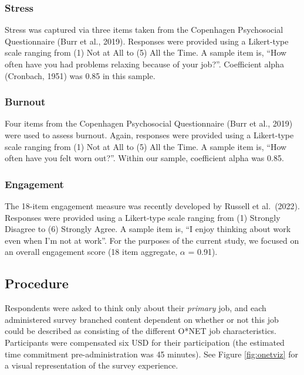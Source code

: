 \documentclass[
  man]{apa7}
\begin{document}
\subsubsection{Stress}\label{stress}

Stress was captured via three items taken from the Copenhagen Psychosocial Questionnaire (Burr et al., 2019). Responses were provided using a Likert-type scale ranging from (1) Not at All to (5) All the Time. A sample item is, ``How often have you had problems relaxing because of your job?''. Coefficient alpha (Cronbach, 1951) was 0.85 in this sample.

\subsubsection{Burnout}\label{burnout}

Four items from the Copenhagen Psychosocial Questionnaire (Burr et al., 2019) were used to assess burnout. Again, responses were provided using a Likert-type scale ranging from (1) Not at All to (5) All the Time. A sample item is, ``How often have you felt worn out?''. Within our sample, coefficient alpha was 0.85.

\subsubsection{Engagement}\label{engagement}

The 18-item engagement measure was recently developed by Russell et al.~(2022). Responses were provided using a Likert-type scale ranging from (1) Strongly Disagree to (6) Strongly Agree. A sample item is, ``I enjoy thinking about work even when I'm not at work''. For the purposes of the current study, we focused on an overall engagement score (18 item aggregate, \(\alpha\) = 0.91).

\subsection{Procedure}\label{procedure}

Respondents were asked to think only about their \emph{primary} job, and each administered survey branched content dependent on whether or not this job could be described as consisting of the different O*NET job characteristics. Participants were compensated six USD for their participation (the estimated time commitment pre-administration was 45 minutes). See Figure \ref{fig:onetviz} for a visual representation of the survey experience.
\end{document}
